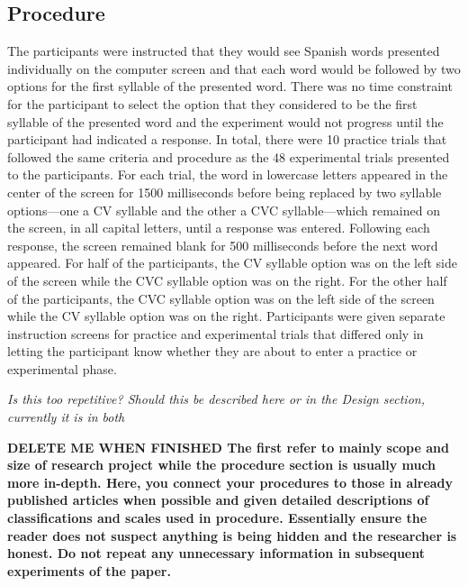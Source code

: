 \subsection{Procedure}

The participants were instructed that they would see Spanish words presented individually on the computer screen and that each word would be followed by two options for the first syllable of the presented word. There was no time constraint for the participant to select the option that they considered to be the first syllable of the presented word and the experiment would not progress until the participant had indicated a response. In total, there were 10 practice trials that followed the same criteria and procedure as the 48 experimental trials presented to the participants. For each trial, the word in lowercase letters appeared in the center of the screen for 1500 milliseconds before being replaced by two syllable options---one a CV syllable and the other a CVC syllable---which remained on the screen, in all capital letters, until a response was entered. Following each response, the screen remained blank for 500 milliseconds before the next word appeared. For half of the participants, the CV syllable option was on the left side of the screen while the CVC syllable option was on the right. For the other half of the participants, the CVC syllable option was on the left side of the screen while the CV syllable option was on the right. Participants were given separate instruction screens for practice and experimental trials that differed only in letting the participant know whether they are about to enter a practice or experimental phase.

\emph{Is this too repetitive? Should this be described here or in the Design section, currently it is in both}

\textbf{DELETE ME WHEN FINISHED
The first refer to mainly scope and size of research project while the procedure section is usually much more in-depth. Here, you connect your procedures to those in already published articles when possible and given detailed descriptions of classifications and scales used in procedure. Essentially ensure the reader does not suspect anything is being hidden and the researcher is honest. Do not repeat any unnecessary information in subsequent experiments of the paper.}


